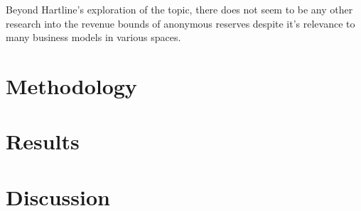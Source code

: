 \documentclass{acm_proc_article-sp}
\begin{document}
Beyond Hartline's exploration of the topic, there does not seem to be any other research into the revenue bounds of anonymous reserves despite it's relevance to many business models in various spaces.

\section{Methodology}

\section{Results}

\section{Discussion}
\end{document}
